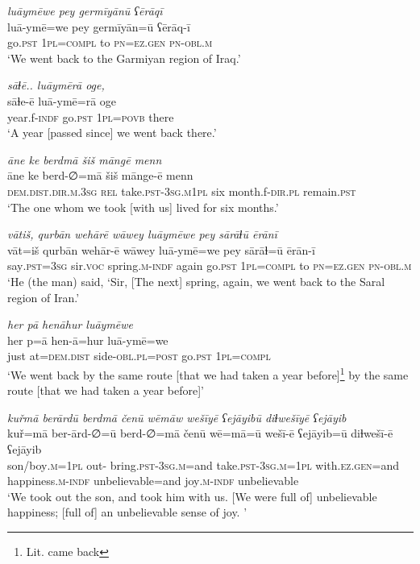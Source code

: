 \ea \label{ZQ.27}
\textit{luāymēwe pey germīyānū ʕērāqī} \\ 
\gll luā-ymē=we pey germīyān=ū ʕērāq-ī \\ 
 go\textsc{.pst} \textsc{1pl}\textsc{=compl} to \textsc{pn}\textsc{=ez.gen} \textsc{pn}\textsc{-obl}\textsc{.m} \\ 
\glt `We went back to the Garmiyan region of Iraq.'
\z 
 
\ea \label{ZQ.28}
\textit{sāɫē.. luāymērā oge,} \\ 
\gll sāɫe-ē luā-ymē=rā oge \\ 
 year.f\textsc{-indf} go\textsc{.pst} \textsc{1pl}\textsc{=\textsc{povb}} there \\ 
\glt `A year [passed since] we went back there.'
\z 
 
\ea \label{ZQ.29}
\textit{āne ke berdmā šiš māngē menn} \\ 
\gll āne ke berd-∅=mā šiš mānge-ē menn \\ 
 \textsc{dem.dist}\textsc{.dir}\textsc{.m}\textsc{.3sg} \textsc{rel} take\textsc{.pst}\textsc{-3sg}\textsc{.m}\textsc{1pl} six month.f\textsc{-dir}\textsc{.pl} remain\textsc{.pst} \\ 
\glt `The one whom we took [with us] lived for six months.'
\z 
 
\ea \label{ZQ.33}
\textit{vātiš, qurbān wehārē wāwey luāymēwe pey sārāɫū ērānī} \\ 
\gll vāt=iš qurbān wehār-ē wāwey luā-ymē=we pey sārāɫ=ū ērān-ī \\ 
 say\textsc{.pst}\textsc{=3sg} sir.\textsc{voc} spring\textsc{.m}\textsc{-indf} again go\textsc{.pst} \textsc{1pl}\textsc{=compl} to \textsc{pn}\textsc{=ez.gen} \textsc{pn}\textsc{-obl}\textsc{.m} \\ 
\glt `He (the man) said, ‘Sir, [The next] spring, again, we went back to the Saral region of Iran.'
\z 
 
\ea \label{ZQ.34}
\textit{her pā henāhur luāymēwe} \\ 
\gll her p=ā hen-ā=hur luā-ymē=we \\ 
 just at=\textsc{dem.dist} side\textsc{-obl}\textsc{.pl}\textsc{=\textsc{post}} go\textsc{.pst} \textsc{1pl}\textsc{=compl} \\ 
\glt `We went back by the same route [that we had taken a year before]\footnote{Lit. came back} by the same route [that we had taken a year before]'
\z 
 
\ea \label{ZQ.53}
\textit{kuřmā berārdū berdmā čenū wēmāw wešīyē ʕejāyibū diɫwešīyē ʕejāyib} \\ 
\gll kuř=mā ber-ārd-∅=ū berd-∅=mā čenū wē=mā=ū wešī-ē ʕejāyib=ū diɫwešī-ē ʕejāyib \\ 
 son/boy\textsc{.m}\textsc{=\textsc{1pl}} out- bring\textsc{.pst}\textsc{-3sg}\textsc{.m}=and take\textsc{.pst}\textsc{-3sg}\textsc{.m}\textsc{=\textsc{1pl}} with\textsc{.ez.gen}=and happiness\textsc{.m}\textsc{-indf} unbelievable=and joy\textsc{.m}\textsc{-indf} unbelievable \\ 
\glt `We took out the son, and took him with us. [We were full of] unbelievable happiness; [full of] an unbelievable sense of joy. '
\z 
 
